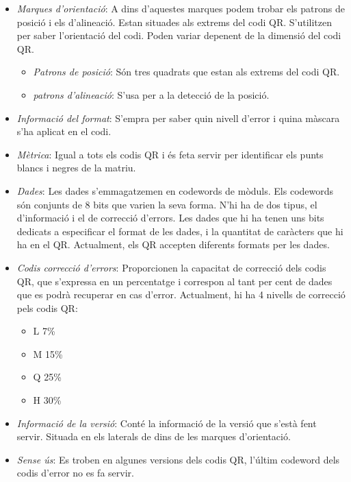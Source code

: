 \begin{itemize}
  \item \emph{Marques d'orientació}: A dins d'aquestes marques podem trobar els patrons de posició i els d'alineació.
  Estan situades als extrems del codi QR. S'utilitzen per saber l'orientació del codi.
  Poden variar depenent de la dimensió del codi QR.
    \begin{itemize}
      \item \emph{Patrons de posició}: Són tres quadrats que estan als extrems del codi QR.
      \item \emph{patrons d'alineació}: S'usa per a la detecció de la posició.
    \end{itemize}
  \item \emph{Informació del format}: S'empra per saber quin nivell d'error i quina màscara s'ha aplicat en el codi.
  \item \emph{Mètrica}: Igual a tots els codis QR i és feta servir per identificar els punts blancs i negres de la matriu.
  \item \emph{Dades}: Les dades s'emmagatzemen en codewords de mòduls. Els codewords són conjunts de 8 bits que varien la seva forma.
  N'hi ha de dos tipus, el d'informació i el de correcció d'errors. Les dades que hi ha tenen uns bits dedicats a especificar
  el format de les dades, i la quantitat de caràcters que hi ha en el QR. Actualment, els QR accepten diferents formats per les dades.
  \item \emph{Codis correcció d'errors}: Proporcionen la capacitat de correcció dels codis QR, que s'expressa en un percentatge i correspon
  al tant per cent de dades que es podrà recuperar en cas d'error. Actualment, hi ha 4 nivells de correcció pels codis QR:
  \begin{itemize}
    \item L 7\%
    \item M 15\%
    \item Q 25\%
    \item H 30\%
  \end{itemize}
  \item \emph{Informació de la versió}: Conté la informació de la versió que s'està fent servir. Situada en els laterals
  de dins de les marques d'orientació.
  \item \emph{Sense ús}: Es troben en algunes versions dels codis QR, l'últim codeword dels codis d'error no es fa servir.
\end{itemize}

